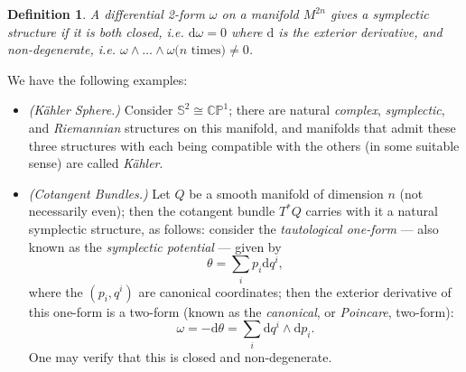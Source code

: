 \documentclass{tufte-handout}
\newtheorem{defn}{Definition}
\def\d{\mathrm{d}}
\begin{document}
\begin{defn}
A differential 2-form $\omega$ on a manifold $M^{2n}$ gives a \emph{symplectic structure} if it is both \emph{closed}, i.e. $\d\omega = 0$ where $\d$ is the exterior derivative, and \emph{non-degenerate}, i.e. $\omega \wedge \ldots \wedge \omega \mbox{($n$ times)} \neq 0$.
\end{defn}

We have the following examples:
\begin{itemize}
\item \emph{(K\"{a}hler Sphere.)} Consider $\mathbb{S}^2 \cong \mathbb{CP}^1$; there are natural \emph{complex}, \emph{symplectic}, and \emph{Riemannian} structures on this manifold, and manifolds that admit these three structures with each being compatible with the others (in some suitable sense) are called \emph{K\"{a}hler}. 

\item \emph{(Cotangent Bundles.)} Let $Q$ be a smooth manifold of dimension $n$ (not necessarily even); then the cotangent bundle $T^*Q$ carries with it a natural symplectic structure, as follows: consider the \emph{tautological one-form} --- also known as the \emph{symplectic potential} --- given by
$$
\theta = \sum_i p_i \d q^i,
$$
where the $(p_i,q^i)$ are canonical coordinates; then the exterior derivative of this one-form is a two-form (known as the \emph{canonical}, or \emph{Poincare}, two-form):
$$
\omega = -\d\theta = \sum_i \d q^i \wedge \d p_i.
$$
One may verify that this is closed and non-degenerate.
\end{itemize}
\end{document}
